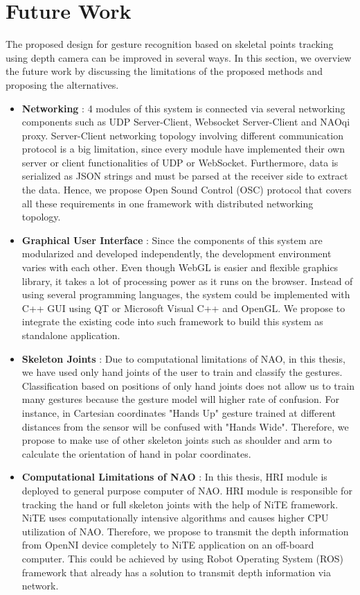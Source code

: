 \section{Future Work} The proposed design for gesture recognition based on skeletal points tracking using depth camera can be improved in several ways. In this section, we overview the future work by discussing the limitations of the proposed methods and proposing the alternatives.
\begin{itemize}
	\item \textbf{Networking} : 4 modules of this system is connected via several networking components such as UDP Server-Client, Websocket Server-Client and NAOqi proxy. Server-Client networking topology involving different communication protocol is a big limitation, since every module have implemented their own server or client functionalities of UDP or WebSocket. Furthermore, data is serialized as JSON strings and must be parsed at the receiver side to extract the data. Hence, we propose Open Sound Control (OSC) protocol that covers all these requirements in one framework with distributed networking topology.
	
	\item \textbf{Graphical User Interface} : Since the components of this system are modularized and developed independently, the development environment varies with each other. Even though WebGL is easier and flexible graphics library, it takes a lot of processing power as it runs on the browser. Instead of using several programming languages, the system could be implemented with C++ GUI using QT or Microsoft Visual C++ and OpenGL. We propose to integrate the existing code into such framework to build this system as standalone application. 
	
	\item \textbf{Skeleton Joints} : Due to computational limitations of NAO, in this thesis, we have used only hand joints of the user to train and classify the gestures. Classification based on positions of only hand joints does not allow us to train many gestures because the gesture model will higher rate of confusion. For instance, in Cartesian coordinates "Hands Up" gesture trained at different distances from the sensor will be confused with "Hands Wide". Therefore, we propose to make use of other skeleton joints such as shoulder and arm to calculate the orientation of hand in polar coordinates.
	
	\item \textbf{Computational Limitations of NAO} : In this thesis, HRI module is deployed to general purpose computer of NAO. HRI module is responsible for tracking the hand or full skeleton joints with the help of NiTE framework. NiTE uses computationally intensive algorithms and causes higher CPU utilization of NAO. Therefore, we propose to transmit the depth information from OpenNI device completely to NiTE application on an off-board computer. This could be achieved by using Robot Operating System (ROS) framework that already has a solution to transmit depth information via network.
	

\end{itemize}
